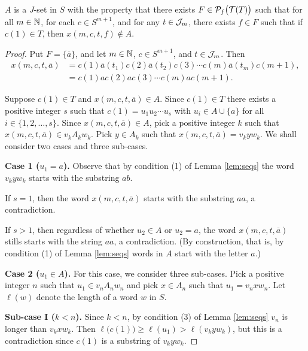 \begin{thm}
  $A$ is a $J$-set in $S$ with the property that there exists $F \in \mathcal{P}_f\bigl( \mathcal{T}(T) \bigr)$ such that for all $m \in \mathbb{N}$, for each $c \in S^{m+1}$, and for any $t \in \mathcal{J}_m$, there exists $f \in F$ such that if $c(1) \in T$, then $x(m, c, t, f) \not\in A$.
\end{thm}
\begin{proof}
  Put $F = \{\overline{a}\}$, and let $m \in \mathbb{N}$, $c \in S^{m+1}$, and $t \in \mathcal{J}_m$. 
  Then
  \begin{align*}
    x(m, c, t, \overline{a}) &= c(1)\overline{a}(t_1)c(2) \overline{a}(t_2)c(3) \cdots c(m) \overline{a}(t_m)c(m+1), \\
                  &= c(1)ac(2)ac(3) \cdots c(m)ac(m+1).
  \end{align*}
  
  Suppose $c(1) \in T$ and $x(m, c, t, \overline{a}) \in A$. 
  Since $c(1) \in T$ there exists a positive integer $s$ such that $c(1) = u_1u_2 \cdots u_s$ with $u_i \in A \cup \{a\}$ for all $i \in \{1, 2, \ldots, s\}$.
  Since $x(m, c, t, \overline{a}) \in A$, pick a positive integer $k$ such that $x(m, c, t, \overline{a}) \in v_kA_kw_k$.
  Pick $y \in A_k$ such that $x(m, c, t, \overline{a}) = v_kyw_k$.
  We shall consider two cases and three sub-cases. 
  
  \textbf{Case 1 ($u_1 = a$).}
  Observe that by condition (1) of Lemma \ref{lem:seqs} the word $v_kyw_k$ starts with the substring $ab$.

  If $s = 1$, then the word $x(m, c, t, \overline{a})$ starts with the substring $aa$, a contradiction.

  If $s > 1$, then regardless of whether $u_2 \in A$ or $u_2 = a$, the word $x(m, c, t, \overline{a})$ stills starts with the string $aa$, a contradiction.
  (By construction, that is, by condition (1) of Lemma \ref{lem:seqs} words in $A$ start with the letter $a$.)

  \textbf{Case 2 ($u_1 \in A$).}
  For this case, we consider three sub-cases. 
  Pick a positive integer $n$ such that $u_1 \in v_n A_n w_n$ and pick $x \in A_n$ such that $u_1 = v_n x w_n$. 
  Let $\ell(w)$ denote the length of a word $w$ in $S$.

  \textbf{Sub-case I ($k < n$).}
  Since $k < n$, by condition (3) of Lemma \ref{lem:seqs} $v_n$ is longer than $v_kxw_k$.
  Then $\ell\bigl( c(1) \bigr) \ge \ell(u_1) > \ell(v_kyw_k)$, but this is a contradiction since $c(1)$ is a substring of $v_kyw_k$.


\end{proof}
